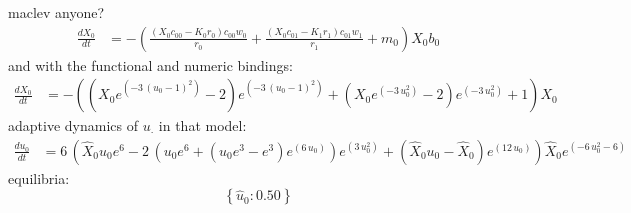 \documentclass{article}
\begin{document}
maclev anyone? 
\[\begin{align*}
\frac{dX_{0}}{dt} &= -{\left(\frac{{\left(X_{0} c_{00} - K_{0} r_{0}\right)} c_{00} w_{0}}{r_{0}} + \frac{{\left(X_{0} c_{01} - K_{1} r_{1}\right)} c_{01} w_{1}}{r_{1}} + m_{0}\right)} X_{0} b_{0}
\end{align*} \
\]
and with the functional and numeric bindings: 
\[\begin{align*}
\frac{dX_{0}}{dt} &= -{\left({\left(X_{0} e^{\left(-3 \, {\left(u_{0} - 1\right)}^{2}\right)} - 2\right)} e^{\left(-3 \, {\left(u_{0} - 1\right)}^{2}\right)} + {\left(X_{0} e^{\left(-3 \, u_{0}^{2}\right)} - 2\right)} e^{\left(-3 \, u_{0}^{2}\right)} + 1\right)} X_{0}
\end{align*} \
\]
adaptive dynamics of $u_\cdot$ in that model:
\[\begin{align*}
\frac{du_{0}}{dt} &= 6 \, {\left(\hat{X}_{0} u_{0} e^{6} - 2 \, {\left(u_{0} e^{6} + {\left(u_{0} e^{3} - e^{3}\right)} e^{\left(6 \, u_{0}\right)}\right)} e^{\left(3 \, u_{0}^{2}\right)} + {\left(\hat{X}_{0} u_{0} - \hat{X}_{0}\right)} e^{\left(12 \, u_{0}\right)}\right)} \hat{X}_{0} e^{\left(-6 \, u_{0}^{2} - 6\right)}
\end{align*} \
\]
equilibria:
\[\left\{\hat{u}_{0} : 0.50\right\} \
\]
\end{document}
